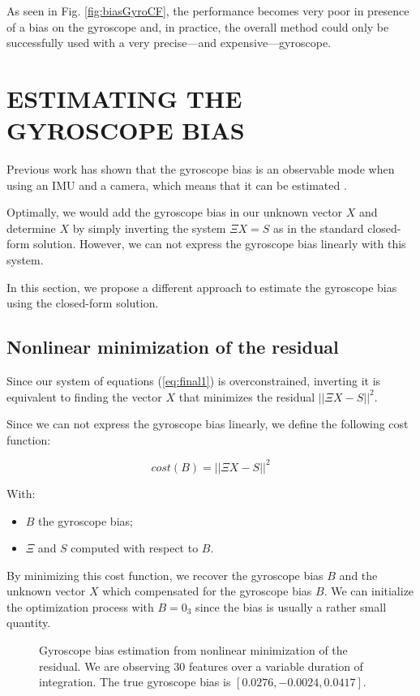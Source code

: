 \documentclass[letterpaper, 10 pt, conference]{ieeeconf}  %
\begin{document}
As seen in Fig. \ref{fig:biasGyroCF}, the performance becomes very poor in presence of a bias on the gyroscope and, in practice, the overall method could only be successfully used with a very precise---and expensive---gyroscope.



\section{ESTIMATING THE GYROSCOPE BIAS}

Previous work has shown that the gyroscope bias is an observable mode when using an IMU and a camera, which means that it can be estimated \cite{Martinelli2012}.

Optimally, we would add the gyroscope bias in our unknown vector $X$ and determine $X$ by simply inverting the system $\Xi X = S$ as in the standard closed-form solution.
However, we can not express the gyroscope bias linearly with this system.

In this section, we propose a different approach to estimate the gyroscope bias using the closed-form solution.

\subsection{Nonlinear minimization of the residual}

Since our system of equations (\ref{eq:final1}) is overconstrained,
inverting it is equivalent to finding the vector $X$ that minimizes the residual $||\Xi X - S||^2$.

Since we can not express the gyroscope bias linearly,
we define the following cost function:

\begin{equation}
  \label{eq:cost}
  cost(B) = ||\Xi X - S||^2
\end{equation}

With:
\begin{itemize}
\item $B$ the gyroscope bias;
\item $\Xi$ and $S$ computed with respect to $B$.
\end{itemize}

By minimizing this cost function, we recover the gyroscope bias $B$ and the unknown vector $X$ which compensated for the gyroscope bias $B$.
We can initialize the optimization process with $B = 0_3$ since the bias is usually a rather small quantity.

\begin{figure}[h!]
  \centering
  \resizebox{0.7\columnwidth}{!}{}
  \caption{Gyroscope bias estimation from nonlinear minimization of the residual. We are observing 30 features  over a variable duration of integration. The true gyroscope bias is $[0.0276,   -0.0024,    0.0417]$. \label{fig:gBiasEstimate}}
\end{figure}
\end{document}
